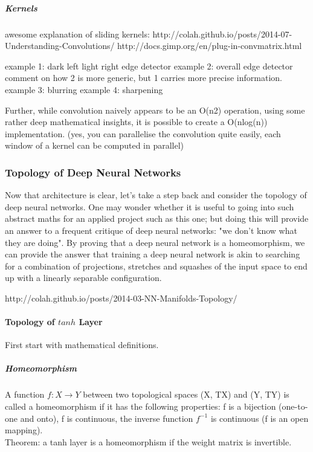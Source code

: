 \documentclass[a4paper,11pt]{article}
\begin{document}
\subparagraph{Kernels}

awesome explanation of sliding kernels:
http://colah.github.io/posts/2014-07-Understanding-Convolutions/
http://docs.gimp.org/en/plug-in-convmatrix.html

example 1: dark left light right edge detector
example 2: overall edge detector
comment on how 2 is more generic, but 1 carries more precise information.
example 3: blurring
example 4: sharpening

Further, while convolution naively appears to be an O(n2) operation, using some rather deep mathematical insights, it is possible to create a O(nlog(n)) implementation. (yes, you can parallelise the convolution quite easily, each window of a kernel can be computed in parallel)

\subsubsection{Topology of Deep Neural Networks}

Now that architecture is clear, let's take a step back and consider the topology of deep neural networks. One may wonder whether it is useful to going into such abstract maths for an applied project such as this one; but doing this will provide an answer to a frequent critique of deep neural networks: "we don't know what they are doing". By proving that a deep neural network is a homeomorphism, we can provide the answer that training a deep neural network is akin to searching for a combination of projections, stretches and squashes of the input space to end up with a linearly separable configuration.

http://colah.github.io/posts/2014-03-NN-Manifolds-Topology/


\paragraph{Topology of $tanh$ Layer}

First start with mathematical definitions. \\

\subparagraph{Homeomorphism}
A function $f: X → Y$ between two topological spaces (X, TX) and (Y, TY) is called a homeomorphism if it has the following properties: 
f is a bijection (one-to-one and onto),
f is continuous,
the inverse function $f^{−1}$ is continuous (f is an open mapping). \\

Theorem: a tanh layer is a homeomorphism if the weight matrix is invertible.
\end{document}
